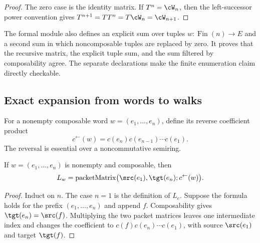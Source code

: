 \begin{proof}
The zero case is the identity matrix.  If $T^n=\cW_n$, then the
left-successor power convention gives
$T^{n+1}=TT^n=T\cW_n=\cW_{n+1}$.
\end{proof}

\begin{remark}
The formal module also defines an explicit sum over tuples
$w:\operatorname{Fin}(n)\to E$ and a second sum in which noncomposable tuples
are replaced by zero.  It proves that the recursive matrix, the explicit tuple sum, and the sum
filtered by composability agree. The separate declarations make the finite
enumeration claim directly checkable.
\end{remark}

\subsection{Exact expansion from words to walks}

For a nonempty composable word $w=(e_1,\ldots,e_n)$, define its reverse
coefficient product
\[
  c^\leftarrow(w)=c(e_n)c(e_{n-1})\cdots c(e_1).
\]
The reversal is essential over a noncommutative semiring.

\begin{lemma}
\label{lem:word-endpoint}
If $w=(e_1,\ldots,e_n)$ is nonempty and composable, then
\[
  L_w
  =
  \operatorname{packetMatrix}
  \bigl(\src(e_1),\tgt(e_n);c^\leftarrow(w)\bigr).
\]
\end{lemma}

\begin{proof}
Induct on $n$.  The case $n=1$ is the definition of $L_e$.  Suppose the
formula holds for the prefix $(e_1,\ldots,e_n)$ and append $f$.  Composability
gives $\tgt(e_n)=\src(f)$.  Multiplying the two packet matrices leaves one
intermediate index and changes the coefficient to
$c(f)c(e_n)\cdots c(e_1)$, with source $\src(e_1)$ and target $\tgt(f)$.
\end{proof}


